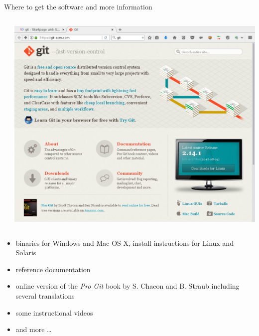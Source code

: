 \documentclass[svgnames]{beamer}
\begin{document}
\begin{frame}{Where to get the software and more information}
 \begin{columns}
  \begin{column}{0.5\textwidth}

   \vspace{2truecm}
  \end{column}%
  \begin{column}{0.5\textwidth}
   \begin{center}
    \includegraphics[width=\textwidth]{gitscm}
   \end{center}
  \end{column}%
 \end{columns}

 \begin{itemize}
  \item binaries for Windows and Mac OS X, install instructions for
        Linux and Solaris
  \item reference documentation
  \item online version of the \textit{Pro Git} book by S. Chacon and B.  Straub
        including several translations
  \item some instructional videos
  \item and more \dots
 \end{itemize}
\end{frame}
\end{document}
